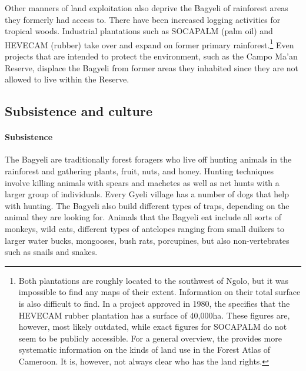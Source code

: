 Other manners of land exploitation also deprive the Bagyeli of rainforest areas they formerly had access to. 
There have been increased logging activities for tropical woods. Industrial plantations such as SOCAPALM (palm oil) and  HEVECAM (rubber) take over and expand on former primary rainforest.\footnote{Both plantations are roughly located to the southwest of Ngolo, but it was impossible to find any maps of their extent. Information on their total surface is also difficult to find. In a project approved in 1980, the \citet{worldbank2015} specifies that the HEVECAM rubber plantation has a surface of 40,000ha. These figures are, however, most likely outdated, while exact figures for SOCAPALM do not seem to be publicly accessible. For a general overview, the \citet{worldres2015} provides more systematic information on the kinds of land use in the Forest Atlas of Cameroon. It is, however, not always clear who has the land rights.} Even projects that are intended to protect the environment, such as the Campo Ma'an Reserve, displace the Bagyeli from former areas they inhabited since they are not allowed to live within the Reserve.




\subsection{Subsistence and culture}
\label{sec:Cult}


\paragraph{Subsistence} The Bagyeli are traditionally forest foragers who live off hunting animals in the rainforest and gathering plants, fruit, nuts, and honey. Hunting techniques involve killing animals with spears and machetes as well as net hunts with a larger group of individuals. Every Gyeli village has a number of dogs that help with hunting. The Bagyeli also build different types of traps, depending on the animal they are looking for. Animals that the Bagyeli eat include all sorts of monkeys, wild cats, different types of antelopes ranging from small duikers to larger water bucks, mongooses, bush rats, porcupines, but also non-vertebrates such as snails and snakes.

